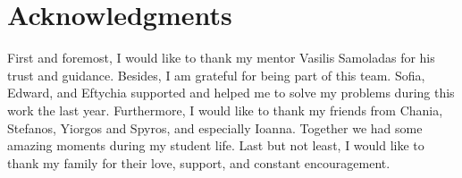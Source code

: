 \chapter*{Acknowledgments}

First and foremost, I would like to thank my mentor Vasilis Samoladas for his trust and guidance.
Besides, I am grateful for being part of this team.
Sofia, Edward, and Eftychia supported and helped me to solve my problems during this work the last year.
Furthermore, I would like to thank my friends from Chania, Stefanos, Yiorgos and Spyros, and especially Ioanna.
Together we had some amazing moments during my student life.
Last but not least, I would like to thank my family for their love, support, and constant encouragement.